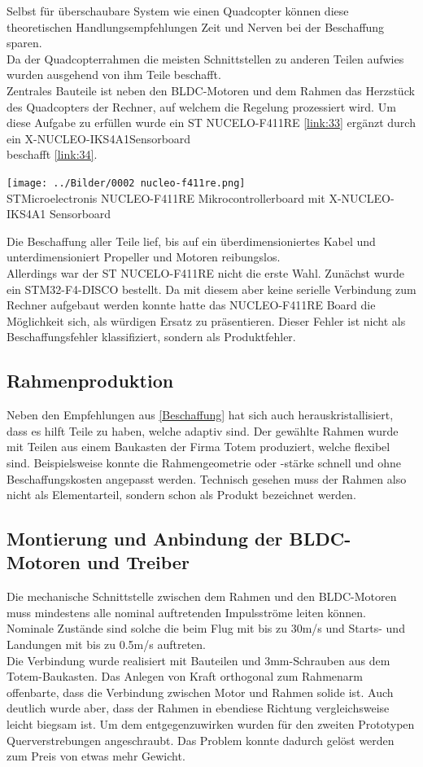 Selbst für überschaubare System wie einen Quadcopter können diese theoretischen Handlungsempfehlungen Zeit und Nerven bei der Beschaffung sparen.\\
Da der Quadcopterrahmen die meisten Schnittstellen zu anderen Teilen aufwies wurden ausgehend von ihm Teile beschafft.\\
Zentrales Bauteile ist neben den BLDC-Motoren und dem Rahmen das Herzstück des Quadcopters der Rechner, auf welchem die Regelung prozessiert wird.
Um diese Aufgabe zu erfüllen wurde ein ST NUCELO-F411RE \ref{link:33} ergänzt durch ein X-NUCLEO-IKS4A1Sensorboard\\ beschafft \ref{link:34}.
\begin{center}
\texttt{[image: ../Bilder/0002 nucleo-f411re.png]}{\\STMicroelectronis NUCLEO-F411RE Mikrocontrollerboard mit X-NUCLEO-IKS4A1 Sensorboard}
\end{center}
Die Beschaffung aller Teile lief, bis auf ein überdimensioniertes Kabel und unterdimensioniert Propeller und Motoren reibungslos.\\
Allerdings war der ST NUCELO-F411RE nicht die erste Wahl. Zunächst wurde ein STM32-F4-DISCO bestellt. Da mit diesem aber keine serielle Verbindung zum Rechner aufgebaut werden konnte hatte das NUCLEO-F411RE Board die Möglichkeit sich, als würdigen Ersatz zu präsentieren. Dieser Fehler ist nicht als Beschaffungsfehler klassifiziert, sondern als Produktfehler.
\subsection{Rahmenproduktion}
Neben den Empfehlungen aus \ref{Beschaffung} hat sich auch herauskristallisiert, dass es hilft Teile zu haben, welche adaptiv sind. Der gewählte Rahmen wurde mit Teilen aus einem Baukasten der Firma Totem produziert, welche flexibel sind. Beispielsweise konnte die Rahmengeometrie oder -stärke schnell und ohne Beschaffungskosten angepasst werden. Technisch gesehen muss der Rahmen also nicht als Elementarteil, sondern schon als Produkt bezeichnet werden.
\subsection{Montierung und Anbindung der BLDC-Motoren und Treiber}
Die mechanische Schnittstelle zwischen dem Rahmen und den BLDC-Motoren muss mindestens alle nominal auftretenden Impulsströme leiten können. Nominale Zustände sind solche die beim Flug mit bis zu 30m/s und Starts- und Landungen mit bis zu 0.5m/s auftreten.\\
Die Verbindung wurde realisiert mit Bauteilen und 3mm-Schrauben aus dem Totem-Baukasten. Das Anlegen von Kraft orthogonal zum Rahmenarm offenbarte, dass die Verbindung zwischen Motor und Rahmen solide ist. Auch deutlich wurde aber, dass der Rahmen in ebendiese Richtung vergleichsweise leicht biegsam ist. Um dem entgegenzuwirken wurden für den zweiten Prototypen Querverstrebungen angeschraubt. Das Problem konnte dadurch gelöst werden zum Preis von etwas mehr Gewicht.

